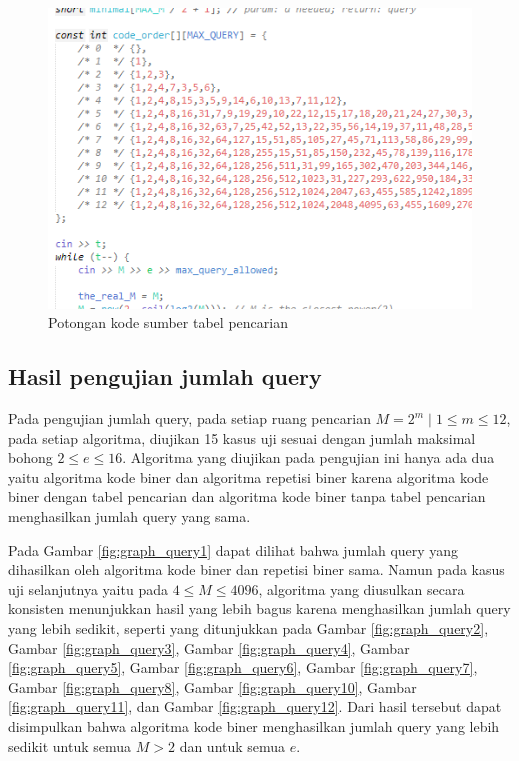 \begin{figure}
\centering
\includegraphics[scale=0.80]{../img/kodingan.png}
\caption{Potongan kode sumber tabel pencarian}
\label{fig:sourcecode_lookup}
\end{figure}


\subsection{Hasil pengujian jumlah query}

Pada pengujian jumlah query, pada setiap ruang pencarian $M=2^m \mid 1 \leq m \leq 12$, pada setiap algoritma, diujikan 15 kasus uji sesuai dengan jumlah maksimal bohong $2 \leq e \leq 16$. Algoritma yang diujikan pada pengujian ini hanya ada dua yaitu algoritma kode biner dan algoritma repetisi biner karena algoritma kode biner dengan tabel pencarian dan algoritma kode biner tanpa tabel pencarian menghasilkan jumlah query yang sama.

Pada Gambar \ref{fig:graph_query1} dapat dilihat bahwa jumlah query yang dihasilkan oleh algoritma kode biner dan repetisi biner sama. Namun pada kasus uji selanjutnya yaitu pada $4 \le M \le 4096$, algoritma yang diusulkan secara konsisten menunjukkan hasil yang lebih bagus karena menghasilkan jumlah query yang lebih sedikit, seperti yang ditunjukkan pada Gambar \ref{fig:graph_query2}, Gambar \ref{fig:graph_query3}, Gambar \ref{fig:graph_query4}, Gambar \ref{fig:graph_query5}, Gambar \ref{fig:graph_query6}, Gambar \ref{fig:graph_query7}, Gambar \ref{fig:graph_query8}, Gambar \ref{fig:graph_query10}, Gambar \ref{fig:graph_query11}, dan Gambar \ref{fig:graph_query12}. Dari hasil tersebut dapat disimpulkan bahwa algoritma kode biner menghasilkan jumlah query yang lebih sedikit untuk semua $M > 2$ dan untuk semua $e$.

